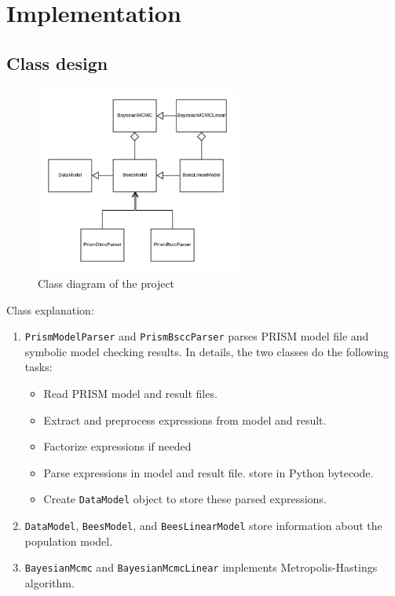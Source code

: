 \documentclass[12pt]{article}
\theoremstyle{definition}
\begin{document}
\section{Implementation}
\subsection{Class design}
\begin{figure}[H]
  \centering
  \includegraphics[width=0.6\textwidth,keepaspectratio]{figures/class_diagram.png}
  \caption{Class diagram of the project}
\end{figure}
Class explanation:
\begin{enumerate}
\item \texttt{PrismModelParser} and \texttt{PrismBsccParser} parses PRISM model
  file and symbolic model checking results. In details, the two classes do the
  following tasks:
  \begin{itemize}
  \item Read PRISM model and result files.
  \item Extract and preprocess expressions from model and result.
  \item Factorize expressions if needed
  \item Parse expressions in model and result file. store in Python bytecode.
  \item Create \texttt{DataModel} object to store these parsed expressions.
  \end{itemize}
\item \texttt{DataModel}, \texttt{BeesModel}, and \texttt{BeesLinearModel} store
  information about the population model.
\item \texttt{BayesianMcmc} and \texttt{BayesianMcmcLinear} implements
  Metropolis-Hastings algorithm.
\end{enumerate}
\end{document}
